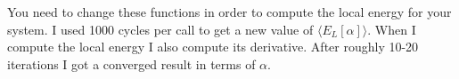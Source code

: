\documentclass[%
oneside,                 %
final,                   %
10pt]{article}
\begin{document}
You need to change these functions in order to compute the local energy for your system. I used 1000
cycles per call to get a new value of $\langle E_L[\alpha]\rangle$.
When I compute the local energy I also compute its derivative.
After roughly 10-20 iterations I got a converged result in terms of $\alpha$.




\end{document}
